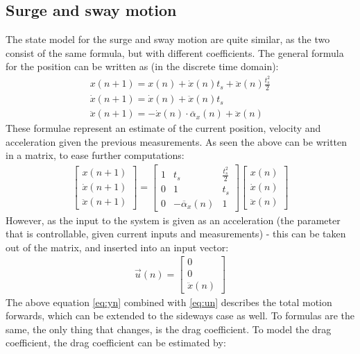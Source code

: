 \subsection{Surge and sway motion}
The state model for the surge and sway motion are quite similar, as the two consist of the same formula, but with different coefficients. The general formula for the position can be written as (in the discrete time domain):
\begin{align}
x(n+1) = x(n) + \dot{x}(n)t_s + \ddot{x}(n)\frac{t_s^2}{2}\\
\dot{x}(n+1) = \dot{x}(n) + \ddot{x}(n)t_s\\
\ddot{x}(n+1) = -\dot{x}(n) \cdot \overline{\alpha}_x(n) + \ddot{x}(n)
\end{align}
These formulae represent an estimate of the current position, velocity and acceleration given the previous measurements. As seen the above can be written in a matrix, to ease further computations:
\begin{align}
\begin{bmatrix}
x(n+1)\\
\dot{x}(n+1)\\
\ddot{x}(n+1)
\end{bmatrix} = \begin{bmatrix}
1 & t_s & \frac{t_s^2}{2}\\
0 & 1 & t_s\\
0 & -\overline{\alpha}_x(n) & 1
\end{bmatrix}\begin{bmatrix}
x(n)\\
\dot{x}(n)\\
\ddot{x}(n)
\end{bmatrix}
\label{eq:yn}
\end{align}
However, as the input to the system is given as an acceleration (the parameter that is controllable, given current inputs and measurements) - this can be taken out of the matrix, and inserted into an input vector:
\begin{align}
\vec{u}(n) = \begin{bmatrix}
0\\
0\\
\ddot{x}(n)
\end{bmatrix}
\label{eq:un}
\end{align}
The above equation \vref{eq:yn} combined with \vref{eq:un} describes the total motion forwards, which can be extended to the sideways case as well. To formulas are the same, the only thing that changes, is the drag coefficient. To model the drag coefficient, the drag coefficient can be estimated by:
